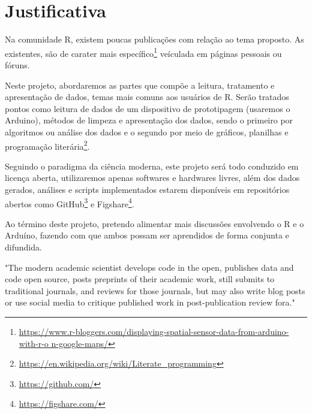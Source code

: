 \chapter[Justificativa]{Justificativa}


Na comunidade R, existem poucas publicações com relação ao tema proposto. As existentes, são de carater mais 
específico\footnote{\url{https://www.r-bloggers.com/displaying-spatial-sensor-data-from-arduino-with-r-o
n-google-maps/}} veículada em páginas pessoais ou fóruns. 

Neste projeto, abordaremos as partes que compõe a leitura, tratamento e 
apresentação de dados, temas mais comuns aos usuários de R. Serão tratados 
pontos como leitura de dados de um dispositivo de prototipagem (usaremos o 
Arduino), métodos de limpeza e apresentação dos dados, sendo o primeiro por 
algoritmos ou análise dos dados e o segundo por meio de gráficos, planilhas e 
programação literária\footnote{\url{https://en.wikipedia.org/wiki/Literate_programming}}.

Seguindo o paradigma da ciência moderna, este projeto será todo conduzido em 
licença aberta, utilizaremos apenas softwares e hardwares livres, além dos dados 
gerados, análises e scripts implementados estarem disponíveis em repositórios 
abertos como GitHub\footnote{\url{https://github.com/}} e Figshare\footnote{\url{https://figshare.com/}}.

Ao término deste projeto, pretendo alimentar mais discussões envolvendo o R e o 
Arduíno, fazendo com que ambos possam ser aprendidos de forma conjunta e 
difundida. 

\begin{citacao}[english]
  "The modern academic scientist develops code in the open, publishes data and 
code open source, posts preprints of their academic work, still submits to 
traditional journals, and reviews for those journals, but may also write blog 
posts or use social media to critique published work in post-publication review 
fora."\cite{Peng2015}
\end{citacao}

